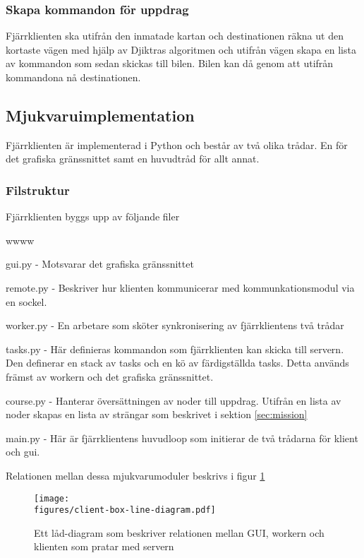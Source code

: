 \documentclass[tekniskrapport/tech.tex]{subfiles}
\begin{document}
\subsubsection{Skapa kommandon för uppdrag}
Fjärrklienten ska utifrån den inmatade kartan och destinationen räkna ut den
kortaste vägen med hjälp av Djiktras algoritmen och utifrån vägen skapa en
lista av kommandon som sedan skickas till bilen. Bilen kan då genom att utifrån
kommandona nå destinationen.

\subsection{Mjukvaruimplementation}
Fjärrklienten är implementerad i Python och består av två olika trådar. En för
det grafiska gränssnittet samt en huvudtråd för allt annat.

\subsubsection{Filstruktur}
Fjärrklienten byggs upp av följande filer

\begin{labeling}{wwww}
	\item[gui.py] - Motsvarar det grafiska gränssnittet
	\item[remote.py] - Beskriver hur klienten kommunicerar med
		kommunkationsmodul via en sockel.
	\item[worker.py] - En arbetare som sköter synkronisering av
		fjärrklientens två trådar
	\item[tasks.py] - Här definieras kommandon som fjärrklienten kan skicka
		till servern. Den definerar en stack av tasks och en kö av
		färdigställda tasks.  Detta används främst av workern och
		det grafiska gränssnittet.
    \item[course.py] - Hanterar översättningen av noder till uppdrag. Utifrån
    en lista av noder skapas en lista av strängar som beskrivet i sektion
    \ref{sec:mission}
    \item[main.py] - Här är fjärrklientens huvudloop som initierar de två
    trådarna för klient och gui.
\end{labeling}
Relationen mellan dessa mjukvarumoduler beskrivs i figur \ref{boxclient}

\begin{figure}[h]
\centering
	\texttt{[image: \\figures/client-box-line-diagram.pdf]}
	\caption{Ett låd-diagram som beskriver relationen mellan GUI,
	workern och klienten som pratar med servern}
	\label{boxclient}
\end{figure} 
\end{document}

